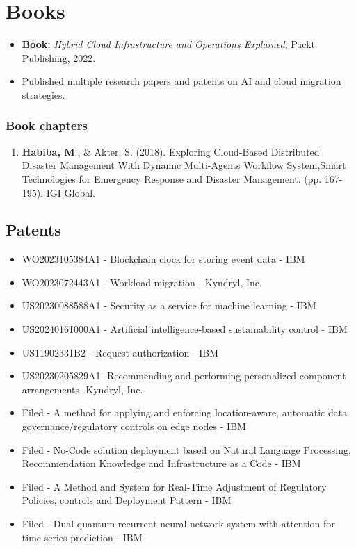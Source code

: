 \documentclass[12pt,]{scrartcl}
\begin{document}
\section*{Books}
\begin{itemize}
    \item \textbf{Book:} \emph{Hybrid Cloud Infrastructure and Operations Explained}, Packt Publishing, 2022.
    \item Published multiple research papers and patents on AI and cloud migration strategies.
\end{itemize}

\subsubsection{Book chapters}\label{book-chapters}

\begin{enumerate}
  \leftskip-0.13in %
  \item \textbf{Habiba, M}., \& Akter, S. (2018). Exploring Cloud-Based Distributed Disaster Management With Dynamic Multi-Agents Workflow System,Smart Technologies for Emergency Response and Disaster Management. (pp. 167-195). IGI Global.
\end{enumerate}


\vspace{0.3cm}

\subsection{Patents}

\begin{itemize}
    \item WO2023105384A1 - Blockchain clock for storing event data - IBM
    \item WO2023072443A1 - Workload migration - Kyndryl, Inc.
    \item US20230088588A1 - Security as a service for machine learning - IBM
    \item US20240161000A1 - Artificial intelligence-based sustainability control - IBM
    \item US11902331B2 - Request authorization - IBM
    \item US20230205829A1- Recommending and performing personalized component arrangements -Kyndryl, Inc.
    \item Filed - A method for applying and enforcing location-aware, automatic data governance/regulatory controls on edge nodes - IBM
    \item Filed - No-Code solution deployment based on Natural Language Processing, Recommendation Knowledge and Infrastructure as a Code - IBM 
    \item Filed - A Method and System for Real-Time Adjustment of Regulatory Policies, controls and Deployment Pattern - IBM 
    \item Filed - Dual quantum recurrent neural network system with attention for time series prediction - IBM
\end{itemize}
\end{document}
